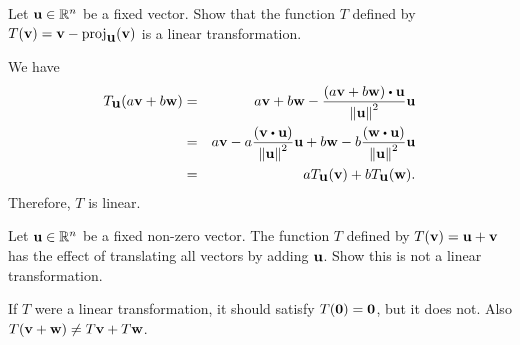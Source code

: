 \begin{ex}
  Let $\mbox{\bf u}\in\mathbb{R}^n$ be a fixed vector.  Show that the function $T$
  defined by
  $T(\vect{v}) = \vect{v}-\proj_{\vect{u}}(\vect{v})$ is a
  linear transformation.
  \begin{sol}
    We have
    \begin{eqnarray*}
      T_{\vect{u}}(a\vect{v}+b\vect{w})
      &=& a\vect{v}+b\vect{w}
          -\frac{(a\vect{v}+b\vect{w})\dotprod\vect{u}}{\norm{\vect{u}}^{2}}
          \vect{u} \\
      &=& a\vect{v}
          -a\frac{(\vect{v}\dotprod\vect{u})}{\norm{\vect{u}}^{2}}\vect{u}
          +b\vect{w}
          -b\frac{(\vect{w}\dotprod\vect{u})}{\norm{\vect{u}}^{2}}\vect{u} \\
      &=& aT_{\vect{u}}(\vect{v}) +bT_{\vect{u}}(\vect{w}).
    \end{eqnarray*}
    Therefore, $T$ is linear.
  \end{sol}
\end{ex}

\begin{ex}
  Let $\mbox{\bf u}\in\mathbb{R}^n$ be a fixed non-zero vector. The function $T$
  defined by $T(\mbox{\bf v})=\mbox{\bf u}+\mbox{\bf v}$ has the effect of
  translating all vectors by adding $\mbox{\bf u}$. Show this is not a
  linear transformation.
  \begin{sol}
    If $T$ were a linear transformation, it should satisfy
    $T(\mbox{\bf 0}) = \mbox{\bf 0}$, but it does not. Also
    $T(\mbox{\bf v}+\mbox{\bf w}) \neq T\mbox{\bf v}+T\mbox{\bf w}$.
  \end{sol}
\end{ex}

